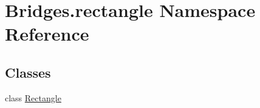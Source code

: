 \hypertarget{namespace_bridges_1_1rectangle}{}\section{Bridges.\+rectangle Namespace Reference}
\label{namespace_bridges_1_1rectangle}
\subsection*{Classes}
\begin{DoxyCompactItemize}
\item 
class \mbox{\hyperlink{class_bridges_1_1rectangle_1_1_rectangle}{Rectangle}}
\end{DoxyCompactItemize}
